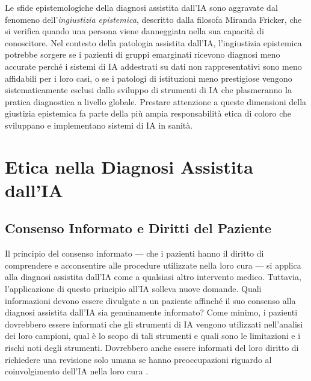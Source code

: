 Le sfide epistemologiche della diagnosi assistita dall'IA sono aggravate dal fenomeno dell'\emph{ingiustizia epistemica}, descritto dalla filosofa Miranda Fricker, che si verifica quando una persona viene danneggiata nella sua capacità di conoscitore. Nel contesto della patologia assistita dall'IA, l'ingiustizia epistemica potrebbe sorgere se i pazienti di gruppi emarginati ricevono diagnosi meno accurate perché i sistemi di IA addestrati su dati non rappresentativi sono meno affidabili per i loro casi, o se i patologi di istituzioni meno prestigiose vengono sistematicamente esclusi dallo sviluppo di strumenti di IA che plasmeranno la pratica diagnostica a livello globale. Prestare attenzione a queste dimensioni della giustizia epistemica fa parte della più ampia responsabilità etica di coloro che sviluppano e implementano sistemi di IA in sanità.

\section{Etica nella Diagnosi Assistita dall'IA}
\label{sec:ch5_ethics}

\subsection{Consenso Informato e Diritti del Paziente}

Il principio del consenso informato — che i pazienti hanno il diritto di comprendere e acconsentire alle procedure utilizzate nella loro cura — si applica alla diagnosi assistita dall'IA come a qualsiasi altro intervento medico. Tuttavia, l'applicazione di questo principio all'IA solleva nuove domande. Quali informazioni devono essere divulgate a un paziente affinché il suo consenso alla diagnosi assistita dall'IA sia genuinamente informato? Come minimo, i pazienti dovrebbero essere informati che gli strumenti di IA vengono utilizzati nell'analisi dei loro campioni, qual è lo scopo di tali strumenti e quali sono le limitazioni e i rischi noti degli strumenti. Dovrebbero anche essere informati del loro diritto di richiedere una revisione solo umana se hanno preoccupazioni riguardo al coinvolgimento dell'IA nella loro cura \cite{zhang2023}.

